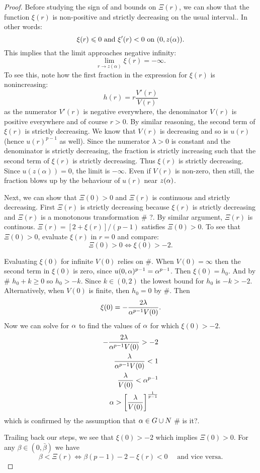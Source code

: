 \begin{proof}
Before studying the sign of and bounds on $\Xi(r)$, we can show that the function $\xi(r)$ is non-positive and strictly decreasing on the usual interval.. In other words: $$\xi(r)\leqslant0\text{ and }\xi'(r)<0\text{ on }(0,z(\alpha)).$$ This implies that the limit approaches negative infinity: $$\lim_{r\to z(\alpha)}\xi(r)=-\infty.$$ To see this, note how the first fraction in the expression for $\xi(r)$ is nonincreasing: $$h(r)=r\frac{V'(r)}{V(r)}$$ as the numerator $V'(r)$ is negative everywhere, the denominator $V(r)$ is positive everywhere and of course $r>0$. By similar reasoning, the second term of $\xi(r)$ is strictly decreasing. We know that $V(r)$ is decreasing and so is $u(r)$ (hence $u(r)^{p-1}$ as well). Since the numerator $\lambda>0$ is constant and the denominator is strictly decreasing, the fraction is strictly increasing such that the second term of $\xi(r)$ is strictly decreasing. Thus $\xi(r)$ is strictly decreasing. Since $u(z(\alpha))=0$, the limit is $-\infty$. Even if $V(r)$ is non-zero, then still, the fraction blows up by the behaviour of $u(r)$ near $z(\alpha)$.

Next, we can show that $\Xi(0)>0$ and $\Xi(r)$ is continuous and strictly decreasing. First $\Xi(r)$ is strictly decreasing because $\xi(r)$ is strictly decreasing and $\Xi(r)$ is a monotonous transformation \# ?. By similar argument, $\Xi(r)$ is continous. $\Xi(r)=\left[2+\xi(r)\right]/(p-1)$ satisfies $\Xi(0)>0$. To see that $\Xi(0)>0$, evaluate $\xi(r)$ in $r=0$ and compare: $$\Xi(0)>0\iff\xi(0)>-2.$$

Evaluating $\xi(0)$ for infinite $V(0)$ relies on \#. When $V(0)=\infty$ then the second term in $\xi(0)$ is zero, since $u(0,\alpha)^{p-1}=\alpha^{p-1}$. Then $\xi(0)=h_0$. And by \# $h_0+k\geq0$ so $h_0>-k$. Since $k\in(0,2)$ the lowest bound for $h_0$ is $-k>-2$. Alternatively, when $V(0)$ is finite, then $h_0=0$ by \#. Then $$\xi(0)=-\frac{2\lambda}{\alpha^{p-1}V(0)}.$$ Now we can solve for $\alpha$ to find the values of $\alpha$ for which $\xi(0)>-2$.
\begin{align*}
  -\frac{2\lambda}{\alpha^{p-1}V(0)}>-2\\
  \frac{\lambda}{\alpha^{p-1}V(0)}<1\\
  \frac{\lambda}{V(0)}<\alpha^{p-1}\\
  \alpha > \left[\frac{\lambda}{V(0)}\right]^{\frac{1}{p-1}}
\end{align*}
which is confirmed by the assumption that $\alpha\in G\cup N$ \# is it?.

Trailing back our steps, we see that $\xi(0)>-2$ which implies $\Xi(0)>0$. For any $\beta\in(0,\bar{\beta})$ we have $$\beta<\Xi(r)\iff\beta(p-1)-2-\xi(r)<0\quad\text{ and vice versa.}$$ 


\end{proof}
